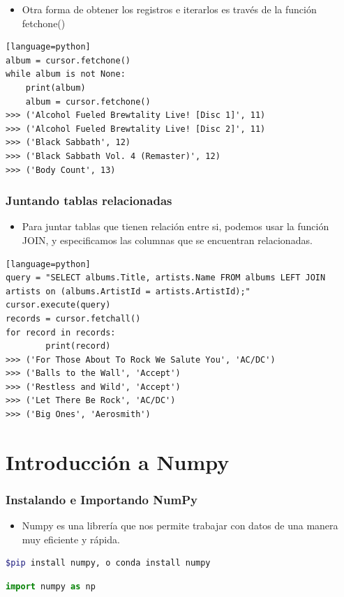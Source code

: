 \documentclass[hyperref={pdfpagelabels=false},xcolor=pst,pdf,fragile]{beamer}
\begin{document}
\begin{frame} [fragile]
    \begin{itemize}
    \item Otra forma de obtener los registros e iterarlos es través de la función fetchone()
    \end{itemize}
    \begin{lstlisting}[basicstyle=\tiny][language=python]
album = cursor.fetchone()
while album is not None:
    print(album)
    album = cursor.fetchone()
>>> ('Alcohol Fueled Brewtality Live! [Disc 1]', 11)
>>> ('Alcohol Fueled Brewtality Live! [Disc 2]', 11)
>>> ('Black Sabbath', 12)
>>> ('Black Sabbath Vol. 4 (Remaster)', 12)
>>> ('Body Count', 13)
    \end{lstlisting}
\end{frame}

\begin{frame} [fragile]
    \frametitle{Juntando tablas relacionadas}
    \begin{itemize}
    \item Para juntar tablas que tienen relación entre si, podemos usar la función JOIN, y especificamos las columnas que se encuentran relacionadas.
    \end{itemize}
    \begin{lstlisting}[basicstyle=\tiny][language=python]
query = "SELECT albums.Title, artists.Name FROM albums LEFT JOIN artists on (albums.ArtistId = artists.ArtistId);"
cursor.execute(query)
records = cursor.fetchall()
for record in records:
        print(record)
>>> ('For Those About To Rock We Salute You', 'AC/DC')
>>> ('Balls to the Wall', 'Accept')
>>> ('Restless and Wild', 'Accept')
>>> ('Let There Be Rock', 'AC/DC')
>>> ('Big Ones', 'Aerosmith')

    \end{lstlisting}
\end{frame}





\section{Introducción a Numpy}
\begin{frame} [fragile]
    \frametitle{Instalando e Importando NumPy}
    \pause
    \begin{itemize}
    \item Numpy es una librería que nos permite trabajar con datos de una manera muy eficiente y rápida.
    \end{itemize}
    
    \begin{lstlisting}[language=bash]
    $pip install numpy, o conda install numpy
    \end{lstlisting}
    \begin{lstlisting}[language=python]
    import numpy as np
    \end{lstlisting}
\end{frame}
\end{document}
